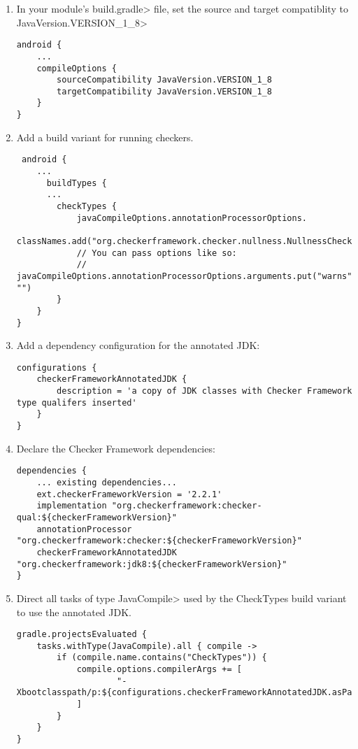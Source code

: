 \begin{enumerate}

\item In your module's \<build.gradle> file, set the source and target
  compatiblity to \<JavaVersion.VERSION\_1\_8>

\begin{Verbatim}
android {
    ...
    compileOptions {
        sourceCompatibility JavaVersion.VERSION_1_8
        targetCompatibility JavaVersion.VERSION_1_8
    }
}
\end{Verbatim}

\item Add a build variant for running checkers.

 \begin{Verbatim}
 android {
    ...
      buildTypes {
      ...
        checkTypes {
            javaCompileOptions.annotationProcessorOptions.
                    classNames.add("org.checkerframework.checker.nullness.NullnessChecker")
            // You can pass options like so:
            // javaCompileOptions.annotationProcessorOptions.arguments.put("warns", "")
        }
    }
}
\end{Verbatim}

\item Add a dependency configuration for the annotated JDK:

\begin{mysmall}
\begin{Verbatim}
configurations {
    checkerFrameworkAnnotatedJDK {
        description = 'a copy of JDK classes with Checker Framework type qualifers inserted'
    }
}

\end{Verbatim}
\end{mysmall}

\item Declare the Checker Framework dependencies:

\begin{mysmall}
\begin{Verbatim}
dependencies {
    ... existing dependencies...
    ext.checkerFrameworkVersion = '2.2.1'
    implementation "org.checkerframework:checker-qual:${checkerFrameworkVersion}"
    annotationProcessor "org.checkerframework:checker:${checkerFrameworkVersion}"
    checkerFrameworkAnnotatedJDK "org.checkerframework:jdk8:${checkerFrameworkVersion}"
}
\end{Verbatim}
\end{mysmall}

\item Direct all tasks of type \<JavaCompile> used by the CheckTypes build variant to use the annotated JDK.
\begin{mysmall}
\begin{Verbatim}
gradle.projectsEvaluated {
    tasks.withType(JavaCompile).all { compile ->
        if (compile.name.contains("CheckTypes")) {
            compile.options.compilerArgs += [
                    "-Xbootclasspath/p:${configurations.checkerFrameworkAnnotatedJDK.asPath}"
            ]
        }
    }
}
\end{Verbatim}
\end{mysmall}


\end{enumerate}
